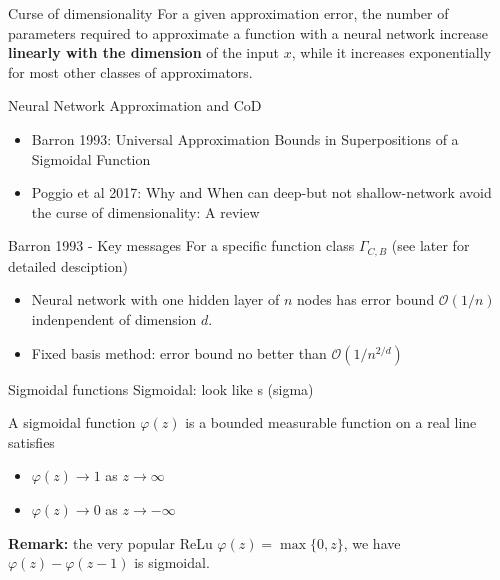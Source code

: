\documentclass[aspectratio=169]{beamer} %
\begin{document}
\begin{frame}{Curse of dimensionality}
For a given approximation error, the number of parameters required to approximate a function with a neural network increase \textbf{linearly with the dimension} of the input $x$, while it increases exponentially for most other classes of approximators.
    
\end{frame}
\begin{frame}{Neural Network Approximation and CoD}
\begin{itemize}
    \item Barron 1993: Universal Approximation Bounds in Superpositions of a Sigmoidal Function
    \item Poggio et al 2017: Why and When can deep-but not shallow-network avoid the curse of dimensionality: A review
\end{itemize}
    
\end{frame}
\begin{frame}{Barron 1993 - Key messages}
For a specific function class $\Gamma_{C,B}$ (see later for detailed desciption)
\begin{itemize}
    \item Neural network with one hidden layer of $n$ nodes has error bound $\mathcal{O}(1/n)$ indenpendent of dimension $d$. 
    \item Fixed basis method: error bound no better than $\mathcal{O}(1/n^{2/d})$
\end{itemize}
\end{frame}
\begin{frame}{Sigmoidal functions}
Sigmoidal: look like s (sigma)
\begin{definition}
    A sigmoidal function $\varphi(z)$ is a bounded measurable function on a real line satisfies
    \begin{itemize}
        \item $\varphi(z)\to 1$ as $z\to \infty$
        \item $\varphi(z) \to 0$ as $z\to-\infty$
    \end{itemize}
\end{definition}
\textbf{Remark:} the very popular ReLu $\varphi(z) = \max\{0,z\}$, we have $\varphi(z)-\varphi(z-1)$ is sigmoidal.
\end{frame}
\end{document}
